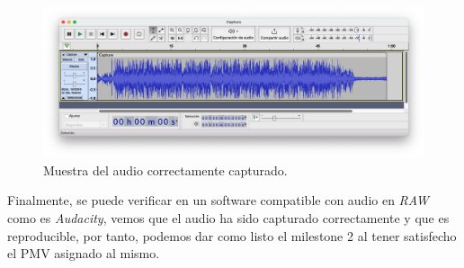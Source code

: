 \begin{figure}[htb]
    \centering
    \includegraphics[width=\textwidth]{fotos/muestra_captura_audacity.png}
    \caption{Muestra del audio correctamente capturado.}
\end{figure}

Finalmente, se puede verificar en un software compatible con audio en \emph{RAW}
como es \emph{Audacity}, vemos que el audio ha sido capturado correctamente y
que es reproducible, por tanto, podemos dar como listo el milestone 2 al
tener satisfecho el PMV asignado al mismo.